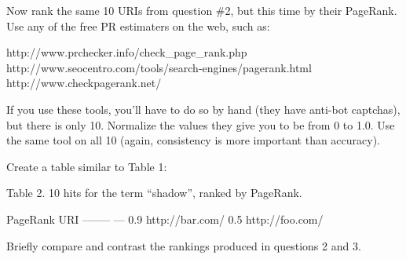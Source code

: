 Now rank the same 10 URIs from question \#2, but this time 
by their PageRank.  Use any of the free PR estimaters on the web,
such as:

http://www.prchecker.info/check\_page\_rank.php
http://www.seocentro.com/tools/search-engines/pagerank.html
http://www.checkpagerank.net/

If you use these tools, you'll have to do so by hand (they have
anti-bot captchas), but there is only 10.  Normalize the values
they give you to be from 0 to 1.0.  Use the same tool on all 10
(again, consistency is more important than accuracy).

Create a table similar to Table 1:

Table 2.  10 hits for the term \enquote{shadow}, ranked by PageRank.

PageRank	URI
--------	---
0.9		http://bar.com/
0.5		http://foo.com/

Briefly compare and contrast the rankings produced in questions 2
and 3.